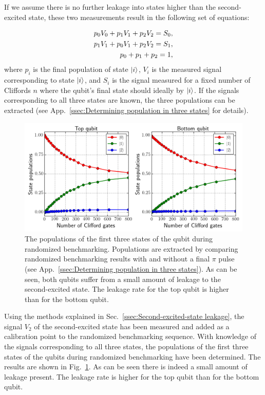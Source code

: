         If we assume there is no further leakage into states higher than the second-excited state, these two measurements result in the following set of equations:

        \begin{align}
          p_0 V_0 + p_1 V_1 + p_2 V_2 = S_0, \notag\\
          p_1 V_1 + p_0 V_1 + p_2 V_2 = S_1, \notag\\
          p_0 + p_1 + p_2 = 1,
          \label{eq:three populations equations}
        \end{align}
        where $p_i$ is the final population of state $\ket{i}$, $V_i$ is the measured signal corresponding to state $\ket{i}$, and $S_i$ is the signal measured for a fixed number of Cliffords $n$ where the qubit's final state should ideally by $\ket{i}$. If the signals corresponding to all three states are known, the three populations can be extracted (see App.~\ref{ssec:Determining population in three states} for details).

        \begin{figure}[tb]
          \centering
          \includegraphics[width=\textwidth]{Figures/Randomized benchmarking/RB_normal_state_populations.png}
          \caption{The populations of the first three states of the qubit during randomized benchmarking. Populations are extracted by comparing randomized benchmarking results with and without a final $\pi$ pulse (see App.~\ref{ssec:Determining population in three states}). As can be seen, both qubits suffer from a small amount of leakage to the second-excited state. The leakage rate for the top qubit is higher than for the bottom qubit.}
          \label{fig:RB normal state populations}
        \end{figure}

        Using the methods explained in Sec.~\ref{ssec:Second-excited-state leakage}, the signal $V_2$ of the second-excited state has been measured and added as a calibration point to the randomized benchmarking sequence. With knowledge of the signals corresponding to all three states, the populations of the first three states of the qubits during randomized benchmarking have been determined. The results are shown in Fig.~\ref{fig:RB normal state populations}. As can be seen there is indeed a small amount of leakage present. The leakage rate is higher for the top qubit than for the bottom qubit.

